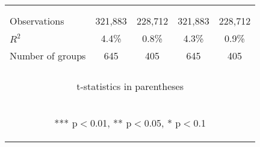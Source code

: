 \documentclass[border=0.2cm]{standalone}
\begin{document}
\begin{tabular}{lcccc}
    \vspace{4pt}           &                                                &                                                &                                                &                                                \\
    \vspace{4pt}           & \begin{footnotesize}\end{footnotesize}         & \begin{footnotesize}\end{footnotesize}         & \begin{footnotesize}\end{footnotesize}         & \begin{footnotesize}\end{footnotesize}         \\
    Observations           & 321,883                                        & 228,712                                        & 321,883                                        & 228,712                                        \\
    $R^2$                  & 4.4\%                                          & 0.8\%                                          & 4.3\%                                          & 0.9\%                                          \\
    Number of groups       & 645                                            & 405                                            & 645                                            & 405                                            \\
    \vspace{2pt}           & \begin{footnotesize}\end{footnotesize}         & \begin{footnotesize}\end{footnotesize}         & \begin{footnotesize}\end{footnotesize}         & \begin{footnotesize}\end{footnotesize}         \\
    
    \bottomrule
    \multicolumn{5}{c}{\begin{footnotesize} t-statistics in parentheses\end{footnotesize}}                                                                                                                                     \\
    \multicolumn{5}{c}{\begin{footnotesize} *** p$<$0.01, ** p$<$0.05, * p$<$0.1\end{footnotesize}}                                                                                                                            \\
\end{tabular}
\end{document}
